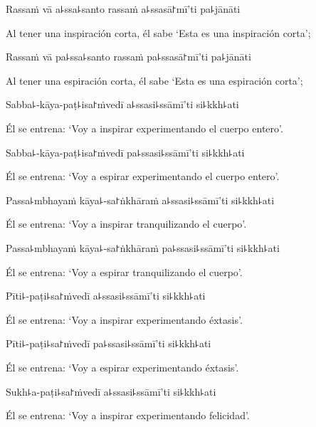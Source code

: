 Rassaṁ vā a꜕ssa꜕santo rassaṁ a꜕ssasā꜓mī'ti pa꜕jānāti

\begin{english}
  Al tener una inspiración corta, él sabe `Esta es una inspiración corta';
\end{english}

Rassaṁ vā pa꜕ssa꜕santo rassaṁ pa꜕ssasā꜓mī'ti pa꜕jānāti

\begin{english}
  Al tener una espiración corta, él sabe `Esta es una espiración corta';
\end{english}

Sabba꜕-kāya-paṭ꜕isa꜓ṁvedī a꜕ssasi꜕ssāmī'ti si꜕kkh꜕ati

\begin{english}
  Él se entrena: `Voy a inspirar experimentando el cuerpo entero'.
\end{english}

Sabba꜕-kāya-paṭ꜕isa꜓ṁvedī pa꜕ssasi꜕ssāmī'ti si꜕kkh꜕ati

\begin{english}
  Él se entrena: `Voy a espirar experimentando el cuerpo entero'.
\end{english}

Passa꜕mbhayaṁ kāya꜕-sa꜓ṅkhāraṁ a꜕ssasi꜕ssāmī'ti si꜕kkh꜕ati

\begin{english}
  Él se entrena: `Voy a inspirar tranquilizando el cuerpo'.
\end{english}

Passa꜕mbhayaṁ kāya꜕-sa꜓ṅkhāraṁ pa꜕ssasi꜕ssāmī'ti si꜕kkh꜕ati

\begin{english}
  Él se entrena: `Voy a espirar tranquilizando el cuerpo'.
\end{english}

Pīti꜕-paṭi꜕sa꜓ṁvedī a꜕ssasi꜕ssāmī'ti si꜕kkh꜕ati

\begin{english}
  Él se entrena: `Voy a inspirar experimentando éxtasis'.
\end{english}

Pīti꜕-paṭi꜕sa꜓ṁvedī pa꜕ssasi꜕ssāmī'ti si꜕kkh꜕ati

\begin{english}
  Él se entrena: `Voy a espirar experimentando éxtasis'.
\end{english}

Sukh꜕a-paṭi꜕sa꜓ṁvedī a꜕ssasi꜕ssāmī'ti si꜕kkh꜕ati

\begin{english}
  Él se entrena: `Voy a inspirar experimentando felicidad'.
\end{english}


